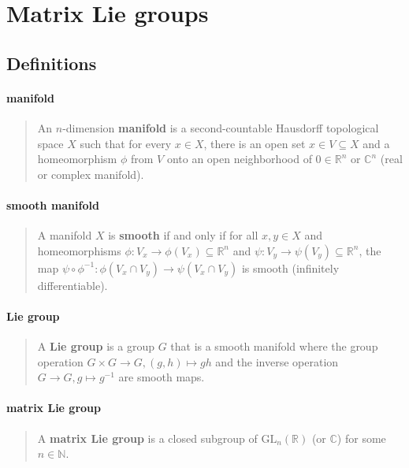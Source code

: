 \documentclass[letterpaper, 10pt]{article}
\theoremstyle{theostyle}
\begin{document}
\section{Matrix Lie groups}

\subsection{Definitions}

\paragraph{manifold}
\begin{quote}
    An \(n\)-dimension \textbf{manifold} is a second-countable Hausdorff topological space \(X\) such that for every \(x \in X\), there is an open set \(x \in V \subseteq X\) and
    a homeomorphism \(\phi\) from \(V\) onto an open neighborhood of \(0 \in \mathbb{R}^n\) or \(\mathbb{C}^n\) (real or complex manifold).
\end{quote}

\paragraph{smooth manifold}
\begin{quote}
    A manifold \(X\) is \textbf{smooth} if and only if for all \(x,y \in X\) and homeomorphisms \(\phi: V_x \rightarrow \phi(V_x) \subseteq \mathbb{R}^n\) and 
    \(\psi: V_y \rightarrow \psi(V_y) \subseteq \mathbb{R}^n\), the map \(\psi \circ \phi^{-1} : \phi(V_x \cap V_y) \rightarrow \psi (V_x \cap V_y)\) is smooth (infinitely differentiable).
\end{quote}

\paragraph{Lie group}
\begin{quote}
    A \textbf{Lie group} is a group \(G\) that is a smooth manifold where the group operation \(G \times G \rightarrow G, (g, h) \mapsto gh\)
    and the inverse operation \(G \rightarrow G, g \mapsto g^{-1}\) are smooth maps.
\end{quote}

\paragraph{matrix Lie group}
\begin{quote}
    A \textbf{matrix Lie group} is a closed subgroup of \(\mathrm{GL}_n(\mathbb{R})\)  (or \(\mathbb{C}\)) for some \(n \in \mathbb{N}\).
\end{quote}
\end{document}
